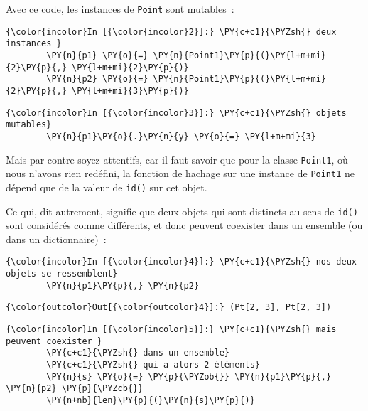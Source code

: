     Avec ce code, les instances de \texttt{Point} sont mutables~:

    \begin{Verbatim}[commandchars=\\\{\}]
{\color{incolor}In [{\color{incolor}2}]:} \PY{c+c1}{\PYZsh{} deux instances }
        \PY{n}{p1} \PY{o}{=} \PY{n}{Point1}\PY{p}{(}\PY{l+m+mi}{2}\PY{p}{,} \PY{l+m+mi}{2}\PY{p}{)}
        \PY{n}{p2} \PY{o}{=} \PY{n}{Point1}\PY{p}{(}\PY{l+m+mi}{2}\PY{p}{,} \PY{l+m+mi}{3}\PY{p}{)}
\end{Verbatim}


    \begin{Verbatim}[commandchars=\\\{\}]
{\color{incolor}In [{\color{incolor}3}]:} \PY{c+c1}{\PYZsh{} objets mutables}
        \PY{n}{p1}\PY{o}{.}\PY{n}{y} \PY{o}{=} \PY{l+m+mi}{3}
\end{Verbatim}


    Mais par contre soyez attentifs, car il faut savoir que pour la classe
\texttt{Point1}, où nous n'avons rien redéfini, la fonction de hachage
sur une instance de \texttt{Point1} ne dépend que de la valeur de
\texttt{id()} sur cet objet.

Ce qui, dit autrement, signifie que deux objets qui sont distincts au
sens de \texttt{id()} sont considérés comme différents, et donc peuvent
coexister dans un ensemble (ou dans un dictionnaire)~:

    \begin{Verbatim}[commandchars=\\\{\}]
{\color{incolor}In [{\color{incolor}4}]:} \PY{c+c1}{\PYZsh{} nos deux objets se ressemblent}
        \PY{n}{p1}\PY{p}{,} \PY{n}{p2}
\end{Verbatim}


\begin{Verbatim}[commandchars=\\\{\}]
{\color{outcolor}Out[{\color{outcolor}4}]:} (Pt[2, 3], Pt[2, 3])
\end{Verbatim}
            
    \begin{Verbatim}[commandchars=\\\{\}]
{\color{incolor}In [{\color{incolor}5}]:} \PY{c+c1}{\PYZsh{} mais peuvent coexister }
        \PY{c+c1}{\PYZsh{} dans un ensemble}
        \PY{c+c1}{\PYZsh{} qui a alors 2 éléments}
        \PY{n}{s} \PY{o}{=} \PY{p}{\PYZob{}} \PY{n}{p1}\PY{p}{,} \PY{n}{p2} \PY{p}{\PYZcb{}}
        \PY{n+nb}{len}\PY{p}{(}\PY{n}{s}\PY{p}{)}
\end{Verbatim}


